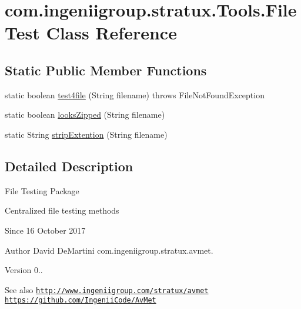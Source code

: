 \hypertarget{classcom_1_1ingeniigroup_1_1stratux_1_1_tools_1_1_file_test}{}\section{com.\+ingeniigroup.\+stratux.\+Tools.\+File\+Test Class Reference}
\label{classcom_1_1ingeniigroup_1_1stratux_1_1_tools_1_1_file_test}
\subsection*{Static Public Member Functions}
\begin{DoxyCompactItemize}
\item 
static boolean \hyperlink{classcom_1_1ingeniigroup_1_1stratux_1_1_tools_1_1_file_test_a8a15050b9f5f142a250a44caa7295cd3}{test4file} (String filename)  throws File\+Not\+Found\+Exception 
\item 
static boolean \hyperlink{classcom_1_1ingeniigroup_1_1stratux_1_1_tools_1_1_file_test_a68b4f72c2de683eddba260bd8ec483ed}{looks\+Zipped} (String filename)
\item 
static String \hyperlink{classcom_1_1ingeniigroup_1_1stratux_1_1_tools_1_1_file_test_ab8a9306a5851446eac08e2570c54166b}{strip\+Extention} (String filename)
\end{DoxyCompactItemize}


\subsection{Detailed Description}
File Testing Package

Centralized file testing methods

\begin{DoxySince}{Since}
16 October 2017 
\end{DoxySince}
\begin{DoxyAuthor}{Author}
David De\+Martini  com.\+ingeniigroup.\+stratux.\+avmet. 
\end{DoxyAuthor}
\begin{DoxyVersion}{Version}
0.. 
\end{DoxyVersion}
\begin{DoxySeeAlso}{See also}
\href{http://www.ingeniigroup.com/stratux/avmet}{\tt http\+://www.\+ingeniigroup.\+com/stratux/avmet}  \href{https://github.com/IngeniiCode/AvMet}{\tt https\+://github.\+com/\+Ingenii\+Code/\+Av\+Met} 
\end{DoxySeeAlso}



